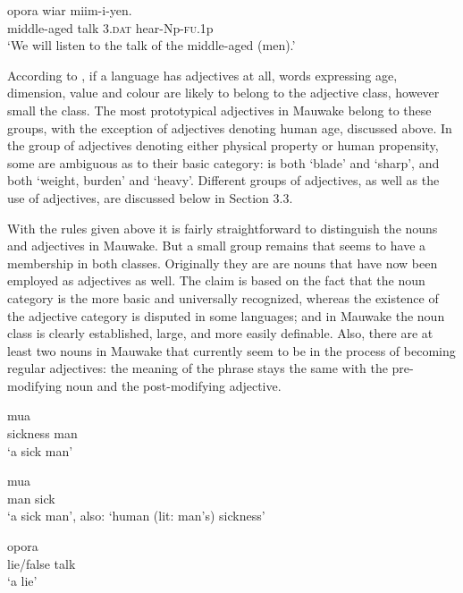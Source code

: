 \ea%
\label{ex:3:x25}
\gll {} opora wiar miim-i-yen. \\
middle-aged talk 3.\textsc{dat} hear-Np-\textsc{fu}.1p\\
\glt`We will listen to the talk of the middle-aged (men).'
\z

According to \citet[56]{Dixon1977}, if a language has adjectives at all, words expressing age, dimension, value and colour are likely to belong to the adjective class, however small the class. The most prototypical adjectives in Mauwake belong to these groups, with the exception of adjectives denoting human age, discussed above. In the group of adjectives denoting either physical property or human propensity, some are ambiguous as to their basic category:  is both `blade' and `sharp', and  both `weight, burden' and `heavy'. Different groups of adjectives, as well as the use of adjectives, are discussed below in Section 3.3.

With the rules given above it is fairly straightforward to distinguish the nouns and adjectives in Mauwake. But a small group remains that seems to have a membership in both classes. Originally they are are nouns that have now been employed as adjectives as well. The claim is based on the fact that the noun category is the more basic and universally recognized, whereas the existence of the adjective category is disputed in some languages; and in Mauwake the noun class is clearly established, large, and more easily definable. Also, there are at least two nouns in Mauwake that currently seem to be in the process of becoming regular adjectives: the meaning of the phrase stays the same with the pre-modifying noun and the post-modifying adjective. 

\ea%
\label{ex:3:x107}
\gll {} mua\\
sickness man\\
\glt`a sick man'
\z

\ea%
\label{ex:3:x108}
\gll mua  \\
man sick\\
\glt`a sick man', also: `human (lit: man's) sickness'
\z

\ea%
\label{ex:3:x1822}
\gll {} opora \\
lie/false talk\\
\glt`a lie'
\z

